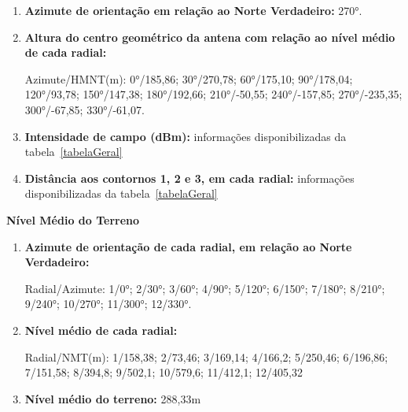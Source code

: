 \begin{enumerate}

\item \textbf{Azimute de orientação em relação ao Norte Verdadeiro:} 270°.

\item \textbf{Altura do centro geométrico da antena com relação ao nível médio de cada radial:}

Azimute/HMNT(m): 0°/185,86; 30°/270,78; 60°/175,10; 90°/178,04; 120°/93,78; 150°/147,38; 180°/192,66; 210°/-50,55; 240°/-157,85; 270°/-235,35; 300°/-67,85; 330°/-61,07.

\item \textbf{Intensidade de campo (dBm):} informações disponibilizadas da tabela~\ref{tabelaGeral}

\item \textbf{Distância aos contornos 1, 2 e 3, em cada radial:} informações disponibilizadas da tabela~\ref{tabelaGeral}

\end{enumerate}

\textbf{Nível Médio do Terreno}

\begin{enumerate}

\item \textbf{Azimute de orientação de cada radial, em relação ao Norte Verdadeiro:}

Radial/Azimute: 1/0°; 2/30°; 3/60°; 4/90°; 5/120°; 6/150°; 7/180°; 8/210°; 9/240°; 10/270°; 11/300°; 12/330°.

\item \textbf{Nível médio de cada radial:}

Radial/NMT(m): 1/158,38; 2/73,46; 3/169,14; 4/166,2; 5/250,46; 6/196,86; 7/151,58; 8/394,8; 9/502,1; 10/579,6; 11/412,1; 12/405,32

\item \textbf{Nível médio do terreno:} 288,33m


\end{enumerate}

